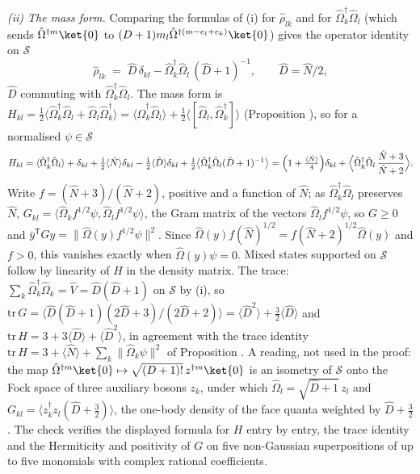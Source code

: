 \emph{(ii) The mass form.} Comparing the formulas of (i) for $\hat\rho_{lk}$ and for $\hat\Omega_{k}^{\dagger}\hat\Omega_{l}$ (which sends $\hat\Omega^{\dagger m}\ket{0}$ to $(D + 1)m_{l}\hat\Omega^{\dagger(m - e_{l} + e_{k})}\ket{0}$) gives the operator identity on $\mathcal{S}$
\[
\hat\rho_{lk} \;=\; \hat{D}\,\delta_{kl} - \hat\Omega_{k}^{\dagger}\hat\Omega_{l}\,(\hat{D} + 1)^{-1}, \qquad \hat{D} = \hat{N}/2,
\]
$\hat{D}$ commuting with $\hat\Omega_{k}^{\dagger}\hat\Omega_{l}$. The mass form is $H_{kl} = \tfrac12\langle\hat\Omega_{k}^{\dagger}\hat\Omega_{l} + \hat\Omega_{l}\hat\Omega_{k}^{\dagger}\rangle = \langle\hat\Omega_{k}^{\dagger}\hat\Omega_{l}\rangle + \tfrac12\langle[\hat\Omega_{l}, \hat\Omega_{k}^{\dagger}]\rangle$ (Proposition ), so for a normalised $\psi \in \mathcal{S}$
\[
H_{kl} = \langle\hat\Omega_{k}^{\dagger}\hat\Omega_{l}\rangle + \delta_{kl} + \tfrac12\langle\hat{N}\rangle\delta_{kl} - \tfrac12\langle\hat{D}\rangle\delta_{kl} + \tfrac12\bigl\langle\hat\Omega_{k}^{\dagger}\hat\Omega_{l}(\hat{D} + 1)^{-1}\bigr\rangle
= \Bigl(1 + \tfrac{\langle\hat{N}\rangle}{4}\Bigr)\delta_{kl} + \Bigl\langle\hat\Omega_{k}^{\dagger}\hat\Omega_{l}\,\frac{\hat{N} + 3}{\hat{N} + 2}\Bigr\rangle .
\]
Write $f = (\hat{N} + 3)/(\hat{N} + 2)$, positive and a function of $\hat{N}$; as $\hat\Omega_{k}^{\dagger}\hat\Omega_{l}$ preserves $\hat{N}$, $G_{kl} = \langle\hat\Omega_{k}f^{1/2}\psi, \hat\Omega_{l}f^{1/2}\psi\rangle$, the Gram matrix of the vectors $\hat\Omega_{l}f^{1/2}\psi$, so $G \ge 0$ and $\bar{y}^{\mathsf T}Gy = \|\hat\Omega(y)f^{1/2}\psi\|^{2}$. Since $\hat\Omega(y)f(\hat{N})^{1/2} = f(\hat{N} + 2)^{1/2}\hat\Omega(y)$ and $f > 0$, this vanishes exactly when $\hat\Omega(y)\psi = 0$. Mixed states supported on $\mathcal{S}$ follow by linearity of $H$ in the density matrix. The trace: $\sum_{k}\hat\Omega_{k}^{\dagger}\hat\Omega_{k} = \hat{V} = \hat{D}(\hat{D} + 1)$ on $\mathcal{S}$ by (i), so $\mathrm{tr}\,G = \langle\hat{D}(\hat{D} + 1)(2\hat{D} + 3)/(2\hat{D} + 2)\rangle = \langle\hat{D}^{2}\rangle + \tfrac32\langle\hat{D}\rangle$ and $\mathrm{tr}\,H = 3 + 3\langle\hat{D}\rangle + \langle\hat{D}^{2}\rangle$, in agreement with the trace identity $\mathrm{tr}\,H = 3 + \langle\hat{N}\rangle + \sum_{k}\|\hat\Omega_{k}\psi\|^{2}$ of Proposition . A reading, not used in the proof: the map $\hat\Omega^{\dagger m}\ket{0} \mapsto \sqrt{(D + 1)!}\,z^{\dagger m}\ket{0}$ is an isometry of $\mathcal{S}$ onto the Fock space of three auxiliary bosons $z_{k}$, under which $\hat\Omega_{l} = \sqrt{\hat{D} + 1}\,z_{l}$ and $G_{kl} = \langle z_{k}^{\dagger}z_{l}(\hat{D} + \tfrac32)\rangle$, the one-body density of the face quanta weighted by $\hat{D} + \tfrac32$. The check verifies the displayed formula for $H$ entry by entry, the trace identity and the Hermiticity and positivity of $G$ on five non-Gaussian superpositions of up to five monomials with complex rational coefficients.

